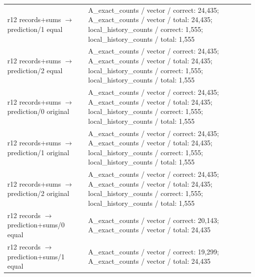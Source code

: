 \begin{longtable}{@{}>{\raggedright\arraybackslash}p{1.800in}>{\raggedright\arraybackslash}p{4.200in}@{}}
r12 records+sums $\to$ prediction/\allowbreak{}1 equal & A\_\allowbreak{}exact\_\allowbreak{}counts /\allowbreak{} vector /\allowbreak{} correct: 24,435; A\_\allowbreak{}exact\_\allowbreak{}counts /\allowbreak{} vector /\allowbreak{} total: 24,435; local\_\allowbreak{}history\_\allowbreak{}counts /\allowbreak{} correct: 1,555; local\_\allowbreak{}history\_\allowbreak{}counts /\allowbreak{} total: 1,555 \\
r12 records+sums $\to$ prediction/\allowbreak{}2 equal & A\_\allowbreak{}exact\_\allowbreak{}counts /\allowbreak{} vector /\allowbreak{} correct: 24,435; A\_\allowbreak{}exact\_\allowbreak{}counts /\allowbreak{} vector /\allowbreak{} total: 24,435; local\_\allowbreak{}history\_\allowbreak{}counts /\allowbreak{} correct: 1,555; local\_\allowbreak{}history\_\allowbreak{}counts /\allowbreak{} total: 1,555 \\
r12 records+sums $\to$ prediction/\allowbreak{}0 original & A\_\allowbreak{}exact\_\allowbreak{}counts /\allowbreak{} vector /\allowbreak{} correct: 24,435; A\_\allowbreak{}exact\_\allowbreak{}counts /\allowbreak{} vector /\allowbreak{} total: 24,435; local\_\allowbreak{}history\_\allowbreak{}counts /\allowbreak{} correct: 1,555; local\_\allowbreak{}history\_\allowbreak{}counts /\allowbreak{} total: 1,555 \\
r12 records+sums $\to$ prediction/\allowbreak{}1 original & A\_\allowbreak{}exact\_\allowbreak{}counts /\allowbreak{} vector /\allowbreak{} correct: 24,435; A\_\allowbreak{}exact\_\allowbreak{}counts /\allowbreak{} vector /\allowbreak{} total: 24,435; local\_\allowbreak{}history\_\allowbreak{}counts /\allowbreak{} correct: 1,555; local\_\allowbreak{}history\_\allowbreak{}counts /\allowbreak{} total: 1,555 \\
r12 records+sums $\to$ prediction/\allowbreak{}2 original & A\_\allowbreak{}exact\_\allowbreak{}counts /\allowbreak{} vector /\allowbreak{} correct: 24,435; A\_\allowbreak{}exact\_\allowbreak{}counts /\allowbreak{} vector /\allowbreak{} total: 24,435; local\_\allowbreak{}history\_\allowbreak{}counts /\allowbreak{} correct: 1,555; local\_\allowbreak{}history\_\allowbreak{}counts /\allowbreak{} total: 1,555 \\
r12 records $\to$ prediction+sums/\allowbreak{}0 equal & A\_\allowbreak{}exact\_\allowbreak{}counts /\allowbreak{} vector /\allowbreak{} correct: 20,143; A\_\allowbreak{}exact\_\allowbreak{}counts /\allowbreak{} vector /\allowbreak{} total: 24,435 \\
r12 records $\to$ prediction+sums/\allowbreak{}1 equal & A\_\allowbreak{}exact\_\allowbreak{}counts /\allowbreak{} vector /\allowbreak{} correct: 19,299; A\_\allowbreak{}exact\_\allowbreak{}counts /\allowbreak{} vector /\allowbreak{} total: 24,435 \\

\end{longtable}
